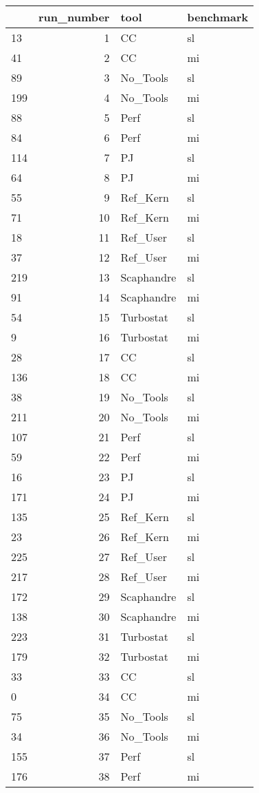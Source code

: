 \begin{tabular}{lrll}
\toprule
 & run_number & tool & benchmark \\
\midrule
13 & 1 & CC & sl \\
41 & 2 & CC & mi \\
89 & 3 & No_Tools & sl \\
199 & 4 & No_Tools & mi \\
88 & 5 & Perf & sl \\
84 & 6 & Perf & mi \\
114 & 7 & PJ & sl \\
64 & 8 & PJ & mi \\
55 & 9 & Ref_Kern & sl \\
71 & 10 & Ref_Kern & mi \\
18 & 11 & Ref_User & sl \\
37 & 12 & Ref_User & mi \\
219 & 13 & Scaphandre & sl \\
91 & 14 & Scaphandre & mi \\
54 & 15 & Turbostat & sl \\
9 & 16 & Turbostat & mi \\
28 & 17 & CC & sl \\
136 & 18 & CC & mi \\
38 & 19 & No_Tools & sl \\
211 & 20 & No_Tools & mi \\
107 & 21 & Perf & sl \\
59 & 22 & Perf & mi \\
16 & 23 & PJ & sl \\
171 & 24 & PJ & mi \\
135 & 25 & Ref_Kern & sl \\
23 & 26 & Ref_Kern & mi \\
225 & 27 & Ref_User & sl \\
217 & 28 & Ref_User & mi \\
172 & 29 & Scaphandre & sl \\
138 & 30 & Scaphandre & mi \\
223 & 31 & Turbostat & sl \\
179 & 32 & Turbostat & mi \\
33 & 33 & CC & sl \\
0 & 34 & CC & mi \\
75 & 35 & No_Tools & sl \\
34 & 36 & No_Tools & mi \\
155 & 37 & Perf & sl \\
176 & 38 & Perf & mi \\

\end{tabular}
